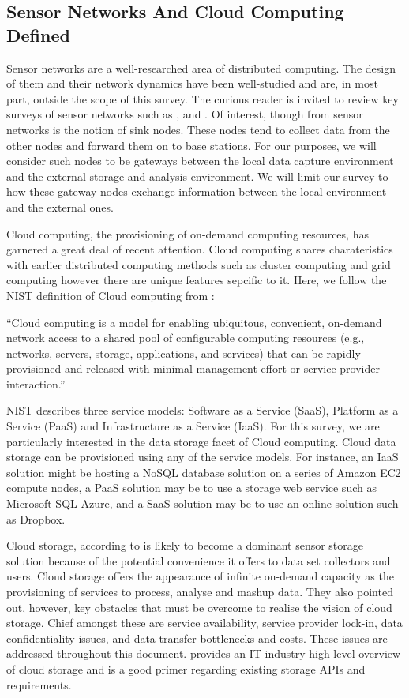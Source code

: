 \subsection{Sensor Networks And Cloud Computing Defined}	
Sensor networks are a well-researched area of distributed computing. The design of them and their network dynamics have been well-studied and are, in most part, outside the scope of this survey. The curious reader is invited to review key surveys of sensor networks such as \cite{Akyildiz2002393}, \cite{1368897} and \cite{Yick20082292}. Of interest, though from sensor networks is the notion of sink nodes. These nodes tend to collect data from the other nodes and forward them on to base stations. For our purposes, we will consider such nodes to be gateways between the local data capture environment and the external storage and analysis environment. We will limit our survey to how these gateway nodes exchange information between the local environment and the external ones.

Cloud computing, the provisioning of on-demand computing resources,	has garnered a great deal of recent attention. Cloud computing shares charateristics with earlier distributed computing methods such as cluster computing and grid computing however there are unique features sepcific to it. Here, we follow the NIST definition of Cloud computing from \cite{Mell2011}:

``Cloud computing is a model for enabling ubiquitous, convenient, on-demand network access to a shared pool of configurable computing resources (e.g., networks, servers, storage, applications, and services) that can be rapidly provisioned and released with minimal management effort or service provider interaction.''

NIST describes three service models: Software as a Service (SaaS), Platform as a Service (PaaS) and Infrastructure as a Service (IaaS). For this survey, we are particularly interested in the data storage facet of Cloud computing. Cloud data storage can be provisioned using any of the service models. For instance, an IaaS solution might be hosting a NoSQL database solution on a series of Amazon EC2 compute nodes, a PaaS solution may be to use a storage web service such as Microsoft SQL Azure, and a SaaS solution may be to use an online solution such as Dropbox.

Cloud storage, according to \cite{armbrust2009above} is likely to become a dominant sensor storage solution because of the potential convenience it offers to data set collectors and users. Cloud storage offers the appearance of infinite on-demand capacity as the provisioning of services to process, analyse and mashup data. They also pointed out, however, key obstacles that must be overcome to realise the vision of cloud storage. Chief amongst these are 	service availability, service provider lock-in, data confidentiality issues, and data transfer bottlenecks and costs. These issues are addressed throughout this document. \cite{Connor2011} provides an IT industry high-level overview of cloud storage and is a good primer regarding existing storage APIs and requirements. 			

